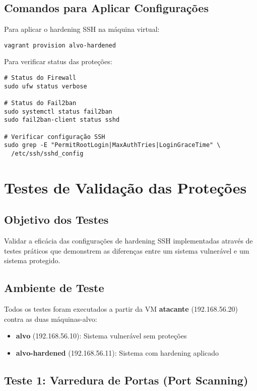 \documentclass[12pt]{article}
\begin{document}
\subsection{Comandos para Aplicar Configurações}

Para aplicar o hardening SSH na máquina virtual:
\begin{verbatim}
vagrant provision alvo-hardened
\end{verbatim}

Para verificar status das proteções:
\begin{verbatim}
# Status do Firewall
sudo ufw status verbose

# Status do Fail2ban
sudo systemctl status fail2ban
sudo fail2ban-client status sshd

# Verificar configuração SSH
sudo grep -E "PermitRootLogin|MaxAuthTries|LoginGraceTime" \
  /etc/ssh/sshd_config
\end{verbatim}

\section{Testes de Validação das Proteções}

\subsection{Objetivo dos Testes}

Validar a eficácia das configurações de hardening SSH implementadas através de testes práticos que demonstrem as diferenças entre um sistema vulnerável e um sistema protegido.

\subsection{Ambiente de Teste}

Todos os testes foram executados a partir da VM \textbf{atacante} (192.168.56.20) contra as duas máquinas-alvo:
\begin{itemize}
    \item \textbf{alvo} (192.168.56.10): Sistema vulnerável sem proteções
    \item \textbf{alvo-hardened} (192.168.56.11): Sistema com hardening aplicado
\end{itemize}

\subsection{Teste 1: Varredura de Portas (Port Scanning)}
\end{document}
